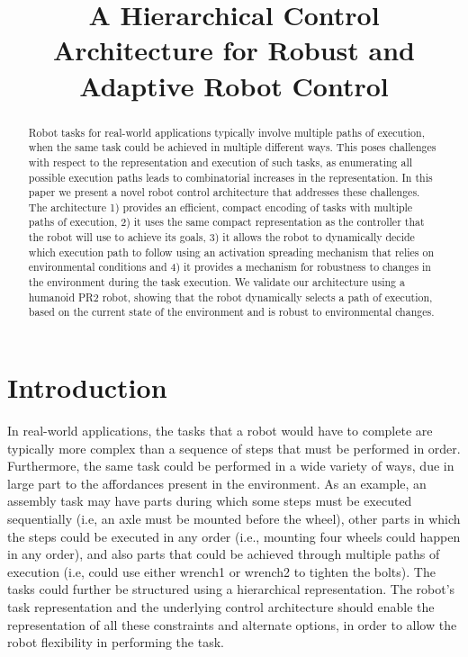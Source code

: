 \documentclass[conference]{article}
\title{A Hierarchical Control Architecture for Robust and Adaptive Robot Control}
\begin{document}
\maketitle

\begin{abstract}
  Robot tasks for real-world applications typically involve multiple paths of execution, when the same task could be achieved in multiple different ways. This poses challenges with respect to the representation and execution of such tasks, as enumerating all possible execution paths leads to combinatorial increases in the representation. In this paper we present a novel robot control architecture that addresses these challenges. The architecture 1) provides an efficient, compact encoding of tasks with multiple paths of execution, 2) it uses the same compact representation as the controller that the robot will use to achieve its goals, 3) it allows the robot to dynamically decide which execution path to follow using an activation spreading mechanism that relies on environmental conditions and 4) it provides a mechanism for robustness to changes in the environment during the task execution. We validate our architecture using a humanoid PR2 robot, showing that the robot dynamically selects a path of execution, based on the current state of the environment and is robust to environmental changes.
\end{abstract}

\section{Introduction}
In real-world applications, the tasks that a robot would have to complete are typically more complex than a sequence of steps that must be performed in order. Furthermore, the same task could be performed in a wide variety of ways, due in large part to the affordances present in the environment. As an example, an assembly task may have parts during which some steps must be executed sequentially (i.e, an axle must be mounted before the wheel), other parts in which the steps could be executed in any order (i.e., mounting four wheels could happen in any order), and also parts that could be achieved through multiple paths of execution (i.e, could use either wrench1 or wrench2 to tighten the bolts). The tasks could further be structured using a hierarchical representation. The robot's task representation and the underlying control architecture should enable the representation of all these constraints and alternate options, in order to allow the robot flexibility in performing the task. 
\end{document}
